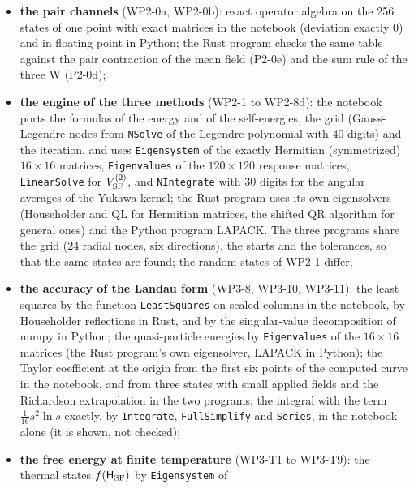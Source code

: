 \documentclass[
  10pt,
]{article}
\begin{document}
\begin{itemize}
  4800 rows), the gap equation by \texttt{FindRoot} with 30 digits, and
  the profiles of the kink by \texttt{FullSimplify} in the notebook; the
  Rust program's own eigensolvers (inertia counting and bisection of
  block-tridiagonal matrices) and the band solver of LAPACK in Python;
\item
  \textbf{the pair channels} (WP2-0a, WP2-0b): exact operator algebra on
  the 256 states of one point with exact matrices in the notebook
  (deviation exactly 0) and in floating point in Python; the Rust
  program checks the same table against the pair contraction of the mean
  field (P2-0e) and the sum rule of the three W (P2-0d);
\item
  \textbf{the engine of the three methods} (WP2-1 to WP2-8d): the
  notebook ports the formulas of the energy and of the self-energies,
  the grid (Gauss-Legendre nodes from \texttt{NSolve} of the Legendre
  polynomial with 40 digits) and the iteration, and uses
  \texttt{Eigensystem} of the exactly Hermitian (symmetrized)
  \(16\times16\) matrices, \texttt{Eigenvalues} of the \(120\times120\)
  response matrices, \texttt{LinearSolve} for \(V^{(2)}_{\rm SF}\), and
  \texttt{NIntegrate} with 30 digits for the angular averages of the
  Yukawa kernel; the Rust program uses its own eigensolvers (Householder
  and QL for Hermitian matrices, the shifted QR algorithm for general
  ones) and the Python program LAPACK. The three programs share the grid
  (24 radial nodes, six directions), the starts and the tolerances, so
  that the same states are found; the random states of WP2-1 differ;
\item
  \textbf{the accuracy of the Landau form} (WP3-8, WP3-10, WP3-11): the
  least squares by the function \texttt{LeastSquares} on scaled columns
  in the notebook, by Householder reflections in Rust, and by the
  singular-value decomposition of numpy in Python; the quasi-particle
  energies by \texttt{Eigenvalues} of the \(16\times16\) matrices (the
  Rust program's own eigensolver, LAPACK in Python); the Taylor
  coefficient at the origin from the first six points of the computed
  curve in the notebook, and from three states with small applied fields
  and the Richardson extrapolation in the two programs; the integral
  with the term \(\tfrac1{16}s^2\ln s\) exactly, by \texttt{Integrate},
  \texttt{FullSimplify} and \texttt{Series}, in the notebook alone (it
  is shown, not checked);
\item
  \textbf{the free energy at finite temperature} (WP3-T1 to WP3-T9): the
  thermal states \(f(\mathsf H_{\rm SF})\) by \texttt{Eigensystem} of

\end{itemize}
\end{document}
